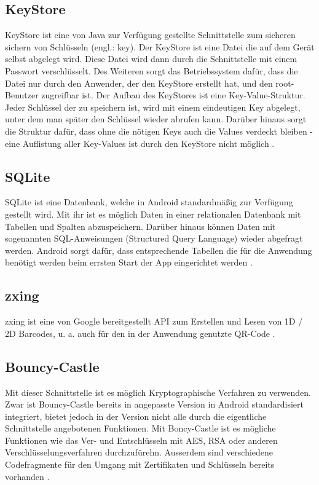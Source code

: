 \documentclass[10pt, a4paper,headsepline]{scrreprt}
\begin{document}
\subsection{KeyStore}
KeyStore ist eine von Java zur Verfügung gestellte Schnittstelle zum sicheren sichern von Schlüsseln  (engl.: key). Der KeyStore ist eine Datei die auf dem Gerät selbst abgelegt wird. Diese Datei wird dann durch die Schnittstelle mit einem Passwort verschlüsselt. Des Weiteren sorgt das Betriebssystem dafür, dass die Datei nur durch den Anwender, der den KeyStore erstellt hat, und den root-Benutzer zugreifbar ist. Der Aufbau des KeyStores ist eine Key-Value-Struktur. Jeder Schlüssel der zu speichern ist, wird mit einem eindeutigen Key abgelegt, unter dem man später den Schlüssel wieder abrufen kann. Darüber hinaus sorgt die Struktur dafür, dass ohne die nötigen Keys auch die Values verdeckt bleiben - eine Auflistung aller Key-Values ist durch den KeyStore nicht möglich \cite{website:javadoc-keystore}.


\subsection{SQLite}
SQLite ist eine Datenbank, welche in Android standardmäßig zur Verfügung gestellt wird. Mit ihr ist es möglich Daten in einer relationalen Datenbank mit Tabellen und Spalten abzuspeichern. Darüber hinaus können Daten mit sogenannten SQL-Anweisungen (Structured Query Language) wieder abgefragt werden. Android sorgt dafür, dass entsprechende Tabellen die für die Anwendung benötigt werden beim errsten Start der App eingerichtet werden \cite{website:sqlite-main}.


\subsection{zxing}
zxing ist eine von Google bereitgestellt API zum Erstellen und Lesen von 1D / 2D Barcodes, u. a. auch für den in der Anwendung genutzte QR-Code \cite{website:zxing-main}.


\subsection{Bouncy-Castle}
Mit dieser Schnittstelle ist es möglich Kryptographische Verfahren zu verwenden. Zwar ist Bouncy-Castle bereits in angepasste Version in Android standardisiert integriert, bietet jedoch in der Version nicht alle durch die eigentliche Schnittstelle angebotenen Funktionen. Mit Boncy-Castle ist es mögliche Funktionen wie das Ver- und Entschlüsseln mit AES, RSA oder anderen Verschlüsselungsverfahren durchzufürehn. Ausserdem sind verschiedene Codefragmente für den Umgang mit Zertifikaten und Schlüsseln bereits vorhanden \cite{website:bouncy-main}.
\end{document}
